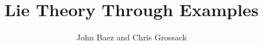 \documentclass[12pt]{book}
\author{John Baez and Chris Grossack}
\title{Lie Theory Through Examples}
\theoremstyle{definition}
\theoremstyle{definition} %
\numberwithin{Exercise}{chapter} %
\begin{document}
\maketitle
\pagebreak

\tableofcontents






% 
% 
\end{document}
